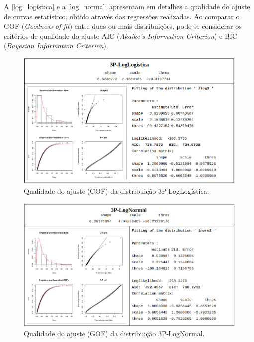 \documentclass[
	12pt,				%
	twoside,			%
	a4paper,			%
	english,			%
	french,				%
	spanish,			%
	brazil				%
	]{abntex2}
\begin{document}
A \autoref{log_logistica} e a \autoref{log_normal} apresentam em
detalhes a qualidade do ajuste de curvas estatístico, obtido através das
regressões realizadas. Ao comparar o GOF (\emph{Goodness-of-fit}) entre
duas ou mais distribuições, pode-se considerar os critérios de qualidade
do ajuste AIC (\emph{Akaike's Information Criterion}) e BIC
(\emph{Bayesian Information Criterion}).

\begin{figure}[htb]
    \caption{\label{log_logistica} Qualidade do ajuste (GOF) da distribuição 3P-LogLogística.}
    \begin{center}
        \includegraphics[scale=0.47]{imagens/log-logistica.jpg}
    \end{center}
\end{figure}
\begin{figure}[htb]
    \caption{\label{log_normal} Qualidade do ajuste (GOF) da distribuição 3P-LogNormal.}
    \begin{center}
        \includegraphics[scale=0.47]{imagens/log-normal.jpg}
    \end{center}
\end{figure}
\end{document}
